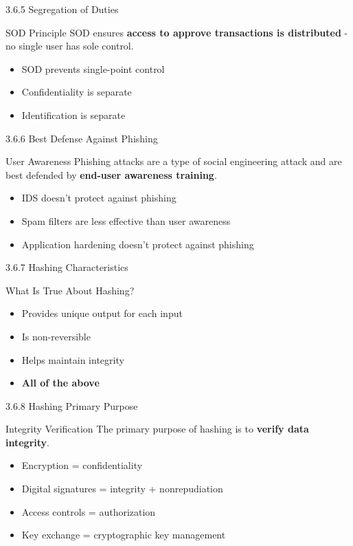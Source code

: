 \documentclass{beamer}
\begin{document}
	\begin{frame}{3.6.5 Segregation of Duties}
		\begin{block}{SOD Principle}
			SOD ensures \textbf{access to approve transactions is distributed} - no single user has sole control.
		\end{block}
		\begin{itemize}
			\item SOD prevents single-point control
			\item Confidentiality is separate
			\item Identification is separate
		\end{itemize}
	\end{frame}
	
	\begin{frame}{3.6.6 Best Defense Against Phishing}
		\begin{block}{User Awareness}
			Phishing attacks are a type of social engineering attack and are best defended by \textbf{end-user awareness training}.
		\end{block}
		\begin{itemize}
			\item IDS doesn't protect against phishing
			\item Spam filters are less effective than user awareness
			\item Application hardening doesn't protect against phishing
		\end{itemize}
	\end{frame}
	
	\begin{frame}{3.6.7 Hashing Characteristics}
		\begin{block}{What Is True About Hashing?}
			\begin{itemize}
				\item Provides unique output for each input
				\item Is non-reversible
				\item Helps maintain integrity
				\item \textbf{All of the above}
			\end{itemize}
		\end{block}
	\end{frame}
	
	\begin{frame}{3.6.8 Hashing Primary Purpose}
		\begin{block}{Integrity Verification}
			The primary purpose of hashing is to \textbf{verify data integrity}.
		\end{block}
		\begin{itemize}
			\item Encryption = confidentiality
			\item Digital signatures = integrity + nonrepudiation
			\item Access controls = authorization
			\item Key exchange = cryptographic key management
		\end{itemize}
	\end{frame}
	
\end{document}
